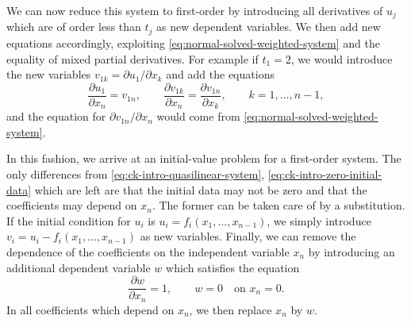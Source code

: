 We can now reduce this system to first-order by introducing all derivatives of $u_j$ which are of order less than $t_j$ as new dependent variables. We then add new equations accordingly, exploiting \eqref{eq:normal-solved-weighted-system} and the equality of mixed partial derivatives. For example if $t_1=2$, we would introduce the new variables $v_{1k}=\partial u_1/\partial x_k$ and add the equations
\begin{equation}\label{eq:reduction-first-order-derivative-relations}
\dfrac{\partial u_1}{\partial x_n}=v_{1n},\qquad\dfrac{\partial v_{1k}}{\partial x_n}=\dfrac{\partial v_{1n}}{\partial x_k},\qquad k=1,\ldots,n-1,
\end{equation}
and the equation for $\partial v_{1n}/\partial x_n$ would come from \eqref{eq:normal-solved-weighted-system}.

In this fashion, we arrive at an initial-value problem for a first-order system. The only differences from \eqref{eq:ck-intro-quasilinear-system}, \eqref{eq:ck-intro-zero-initial-data} which are left are that the initial data may not be zero and that the coefficients may depend on $x_n$. The former can be taken care of by a substitution. If the initial condition for $u_i$ is $u_i=f_i(x_1,\ldots,x_{n-1})$, we simply introduce $v_i=u_i-\allowbreak f_i(x_1,\ldots,x_{n-1})$ as new variables. Finally, we can remove the dependence of the coefficients on the independent variable $x_n$ by introducing an additional dependent variable $w$ which satisfies the equation
\begin{equation}\label{eq:reduction-extra-independent-coordinate}
\dfrac{\partial w}{\partial x_n}=1,\qquad w=0\quad\text{on }x_n=0.
\end{equation}
In all coefficients which depend on $x_n$, we then replace $x_n$ by $w$.

